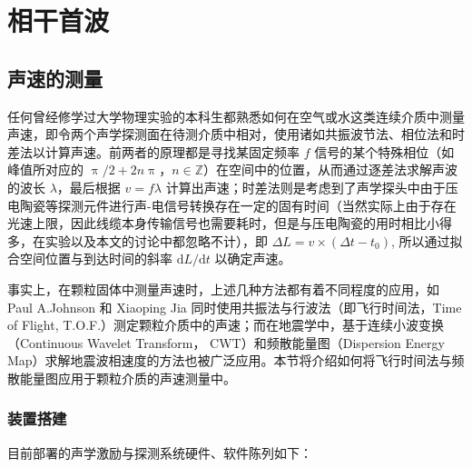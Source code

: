 
\chapter{相干首波}

\section{声速的测量}

任何曾经修学过大学物理实验的本科生都熟悉如何在空气或水这类连续介质中测量声速，即令两个声学探测面在待测介质中相对，使用诸如共振波节法、相位法和时差法以计算声速。前两者的原理都是寻找某固定频率 $f$ 信号的某个特殊相位（如峰值所对应的 $\uppi/2 + 2n\uppi$，$n\in\mathbb{Z}$）在空间中的位置，从而通过逐差法求解声波的波长 $\lambda$，最后根据 $v=f\lambda$ 计算出声速；时差法则是考虑到了声学探头中由于压电陶瓷等探测元件进行声-电信号转换存在一定的固有时间（当然实际上由于存在光速上限，因此线缆本身传输信号也需要耗时，但是与压电陶瓷的用时相比小得多，在实验以及本文的讨论中都忽略不计），即 $\Delta L = v\times(\Delta t - t_{0})$, 所以通过拟合空间位置与到达时间的斜率 $\mathrm{d}L/\mathrm{d}t$ 以确定声速。

事实上，在颗粒固体中测量声速时，上述几种方法都有着不同程度的应用，如 Paul A.Johnson 和 Xiaoping Jia 同时使用共振法与行波法（即飞行时间法，Time of Flight, T.O.F.）测定颗粒介质中的声速\cite{Johnson_2005}；而在地震学中，基于连续小波变换\cite{9356107}（Continuous Wavelet Transform， CWT）和频散能量图（Dispersion Energy Map）求解地震波相速度的方法也被广泛应用。本节将介绍如何将飞行时间法与频散能量图应用于颗粒介质的声速测量中。

\subsection{装置搭建}

目前部署的声学激励与探测系统硬件、软件陈列如下：


